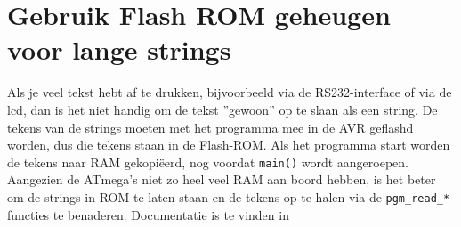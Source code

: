 \documentclass[12pt,a4paper,final,oneside,fleqn]{article}
\begin{document}

\section{Gebruik Flash ROM geheugen voor lange strings}
Als je veel tekst hebt af te drukken, bijvoorbeeld via de RS232-interface
of via de lcd, dan is het niet handig om de tekst ''gewoon'' op te slaan als
een string. De tekens van de strings moeten met het programma mee in de
AVR geflashd worden, dus die tekens staan in de Flash-ROM. Als het programma
start worden de tekens naar RAM gekopi\"{e}erd, nog voordat \texttt{main()}
wordt aangeroepen. Aangezien de ATmega's niet zo heel veel RAM aan boord
hebben, is het beter om de strings in ROM te laten staan en de
tekens op te halen via de \texttt{pgm\_read\_*}-functies te benaderen.
Documentatie is te vinden in \cite{avrlibc2012}
\end{document}
